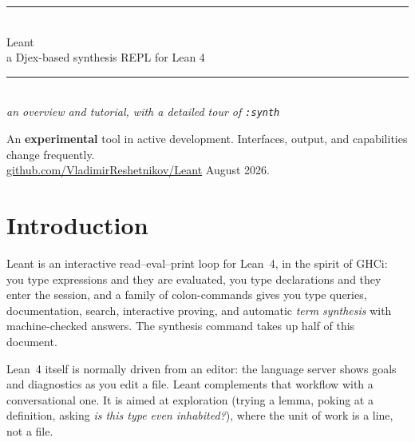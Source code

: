 \documentclass[11pt,oneside]{article}
\newcommand{\code}[1]{\texttt{#1}}
\begin{document}
\begin{titlepage}
\thispagestyle{empty}
\begin{center}
  {\color{sageline}\rule{0.55\textwidth}{0.8pt}}\\[1.7em]
  {\fontsize{34}{40}\selectfont Leant}\\[0.55em]
  {\Large a Djex-based synthesis REPL for Lean 4}\\[1.5em]
  {\color{sageline}\rule{0.55\textwidth}{0.8pt}}\\[2.2em]
  {\large \emph{an overview and tutorial, with a detailed tour of \code{:synth}}}
\end{center}
\begin{center}
  \small\color{lichen}
  An \textbf{experimental} tool in active development.
  Interfaces, output, and capabilities change frequently.\\[0.6em]
  \href{https://github.com/VladimirReshetnikov/Leant}{github.com/VladimirReshetnikov/Leant}\quad
  August 2026.
\end{center}
\end{titlepage}

\clearpage
{\hypersetup{linkcolor=ink}%
 \tableofcontents
 }
\clearpage

\section{Introduction}\label{sec:intro}

Leant is an interactive read--eval--print loop for Lean~4, in the
spirit of GHCi: you type expressions and they are evaluated, you type
declarations and they enter the session, and a family of colon-commands
gives you type queries, documentation, search, interactive proving,
and automatic \emph{term synthesis} with machine-checked answers.
The synthesis command takes up half of this document.

Lean~4 itself is normally driven from an editor: the language server
shows goals and diagnostics as you edit a file. Leant complements that
workflow with a conversational one. It is aimed at exploration (trying a
lemma, poking at a definition, asking \emph{is this type even
inhabited?}), where the unit of work is a line, not a file.
\end{document}
